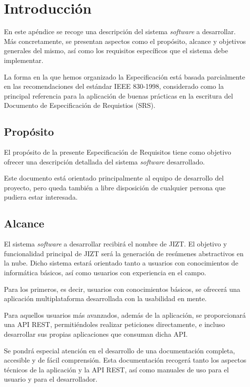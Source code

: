 
\section{Introducción}

En este apéndice se recoge una descripción del sistema \emph{software} a desarrollar. Más concretamente, se presentan aspectos como el propósito, alcance y objetivos generales del mismo, así como los requisitos específicos que el sistema debe implementar.

La forma en la que hemos organizado la Especificación está basada parcialmente en las recomendaciones del estándar IEEE 830-1998, considerado como la principal referencia para la aplicación de buenas prácticas en la escritura del Documento de Especificación de Requistios (SRS).

\subsection{Propósito}

El propósito de la presente Especificación de Requisitos tiene como objetivo ofrecer una descripción detallada del sistema \emph{software} desarrollado.

Este documento está orientado principalmente al equipo de desarrollo del proyecto, pero queda también a libre disposición de cualquier persona que pudiera estar interesada.

\subsection{Alcance}

El sistema \emph{software} a desarrollar recibirá el nombre de JIZT. El objetivo y funcionalidad principal de JIZT será la generación de resúmenes abstractivos en la nube. Dicho sistema estará orientado tanto a usuarios con conocimientos de informática básicos, así como usuarios con experiencia en el campo.

Para los primeros, es decir, usuarios con conocimientos básicos, se ofrecerá una aplicación multiplataforma desarrollada con la usabilidad en mente.

Para aquellos usuarios más avanzados, además de la aplicación, se proporcionará una API REST, permitiéndoles realizar peticiones directamente, e incluso desarrollar sus propias aplicaciones que consuman dicha API.

Se pondrá especial atención en el desarrollo de una documentación completa, accesible y de fácil comprensión. Esta documentación recogerá tanto los aspectos técnicos de la aplicación y la API REST, así como manuales de uso para el usuario y para el desarrollador.

